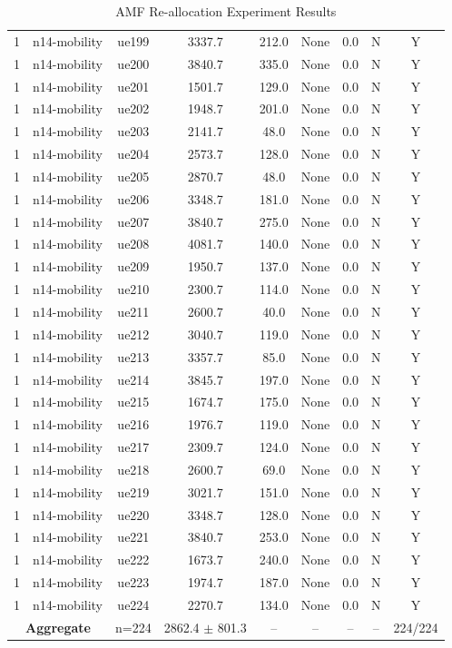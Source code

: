 \begin{table}[ht]
\begin{tabular}{|c|c|c|c|c|c|c|c|c|}
1 & n14-mobility & ue199 & 3337.7 & 212.0 & None & 0.0 & N & Y \\
1 & n14-mobility & ue200 & 3840.7 & 335.0 & None & 0.0 & N & Y \\
1 & n14-mobility & ue201 & 1501.7 & 129.0 & None & 0.0 & N & Y \\
1 & n14-mobility & ue202 & 1948.7 & 201.0 & None & 0.0 & N & Y \\
1 & n14-mobility & ue203 & 2141.7 & 48.0 & None & 0.0 & N & Y \\
1 & n14-mobility & ue204 & 2573.7 & 128.0 & None & 0.0 & N & Y \\
1 & n14-mobility & ue205 & 2870.7 & 48.0 & None & 0.0 & N & Y \\
1 & n14-mobility & ue206 & 3348.7 & 181.0 & None & 0.0 & N & Y \\
1 & n14-mobility & ue207 & 3840.7 & 275.0 & None & 0.0 & N & Y \\
1 & n14-mobility & ue208 & 4081.7 & 140.0 & None & 0.0 & N & Y \\
1 & n14-mobility & ue209 & 1950.7 & 137.0 & None & 0.0 & N & Y \\
1 & n14-mobility & ue210 & 2300.7 & 114.0 & None & 0.0 & N & Y \\
1 & n14-mobility & ue211 & 2600.7 & 40.0 & None & 0.0 & N & Y \\
1 & n14-mobility & ue212 & 3040.7 & 119.0 & None & 0.0 & N & Y \\
1 & n14-mobility & ue213 & 3357.7 & 85.0 & None & 0.0 & N & Y \\
1 & n14-mobility & ue214 & 3845.7 & 197.0 & None & 0.0 & N & Y \\
1 & n14-mobility & ue215 & 1674.7 & 175.0 & None & 0.0 & N & Y \\
1 & n14-mobility & ue216 & 1976.7 & 119.0 & None & 0.0 & N & Y \\
1 & n14-mobility & ue217 & 2309.7 & 124.0 & None & 0.0 & N & Y \\
1 & n14-mobility & ue218 & 2600.7 & 69.0 & None & 0.0 & N & Y \\
1 & n14-mobility & ue219 & 3021.7 & 151.0 & None & 0.0 & N & Y \\
1 & n14-mobility & ue220 & 3348.7 & 128.0 & None & 0.0 & N & Y \\
1 & n14-mobility & ue221 & 3840.7 & 253.0 & None & 0.0 & N & Y \\
1 & n14-mobility & ue222 & 1673.7 & 240.0 & None & 0.0 & N & Y \\
1 & n14-mobility & ue223 & 1974.7 & 187.0 & None & 0.0 & N & Y \\
1 & n14-mobility & ue224 & 2270.7 & 134.0 & None & 0.0 & N & Y \\
\multicolumn{2}{|c|}{\textbf{Aggregate}} & n=224 & 2862.4 $\pm$ 801.3 & -- & -- & -- & -- & 224/224 \\
\hline
\end{tabular}
\caption{AMF Re-allocation Experiment Results}
\label{tab:amf_realloc}
\end{table}
